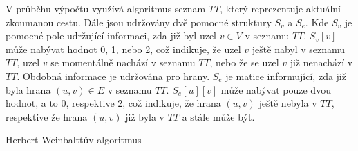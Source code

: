         V průběhu výpočtu využívá algoritmus seznam $TT$, který reprezentuje aktuální zkoumanou cestu. Dále jsou udržovány dvě pomocné struktury $S_v$ a $S_e$. Kde $S_v$ je pomocné pole udržující informaci, zda již byl uzel $v \in V$ v seznamu $TT$. $S_v[v]$ může nabývat hodnot 0, 1, nebo 2, což indikuje, že uzel $v$ ještě nabyl v seznamu $TT$, uzel $v$ se momentálně nachází v seznamu $TT$, nebo že se uzel $v$ již nenachází v $TT$. Obdobná informace je udržována pro hrany. $S_e$ je matice informující, zda již byla hrana $(u, v) \in E$ v seznamu $TT$. $S_e[u][v]$ může nabývat pouze dvou hodnot, a to 0, respektive 2, což indikuje, že hrana $(u, v)$ ještě nebyla v $TT$, respektive že hrana $(u, v)$ již byla v $TT$ a stále může být.

        \begin{algorithm}
            \DontPrintSemicolon
            \caption{Herbert Weinbalttův algoritmus}
            \vspace*{0.5em}

\end{algorithm}
